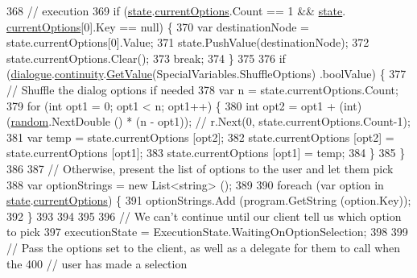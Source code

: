\begin{DoxyCode}
368                 \textcolor{comment}{// execution}
369                 \textcolor{keywordflow}{if} (\hyperlink{a00086_a70f2ce6201cdd2430ceaa764ac614ca0}{state}.\hyperlink{a00089_ab816dfea32ecda23282700f01454e0a9}{currentOptions}.Count == 1 && \hyperlink{a00086_a70f2ce6201cdd2430ceaa764ac614ca0}{state}.
      \hyperlink{a00089_ab816dfea32ecda23282700f01454e0a9}{currentOptions}[0].Key == null) \{
370                     var destinationNode = state.currentOptions[0].Value;
371                     state.PushValue(destinationNode);
372                     state.currentOptions.Clear();
373                     \textcolor{keywordflow}{break};
374                 \}
375 
376                 \textcolor{keywordflow}{if} (\hyperlink{a00086_ac506426c503da5f033247c29e11c5e82}{dialogue}.\hyperlink{a00050_ae94eaa4b03b432422f5d205fabe37ff5}{continuity}.\hyperlink{a00102_accab1fc5c8fc353dbfc53ca0f4029576}{GetValue}(SpecialVariables.ShuffleOptions)
      .boolValue) \{
377                     \textcolor{comment}{// Shuffle the dialog options if needed}
378                     var n = state.currentOptions.Count;
379                     \textcolor{keywordflow}{for} (\textcolor{keywordtype}{int} opt1 = 0; opt1 < n; opt1++) \{
380                         \textcolor{keywordtype}{int} opt2 = opt1 + (int)(\hyperlink{a00086_a408485a00c7cc558428c86ed9dd04fca}{random}.NextDouble () * (n - opt1)); \textcolor{comment}{// r.Next(0,
       state.currentOptions.Count-1);}
381                         var temp = state.currentOptions [opt2];
382                         state.currentOptions [opt2] = state.currentOptions [opt1];
383                         state.currentOptions [opt1] = temp;
384                     \}
385                 \}
386 
387                 \textcolor{comment}{// Otherwise, present the list of options to the user and let them pick}
388                 var optionStrings = \textcolor{keyword}{new} List<string> ();
389 
390                 \textcolor{keywordflow}{foreach} (var option \textcolor{keywordflow}{in} \hyperlink{a00086_a70f2ce6201cdd2430ceaa764ac614ca0}{state}.\hyperlink{a00089_ab816dfea32ecda23282700f01454e0a9}{currentOptions}) \{
391                     optionStrings.Add (program.GetString (option.Key));
392                 \}
393 
394 
395 
396                 \textcolor{comment}{// We can't continue until our client tell us which option to pick}
397                 executionState = ExecutionState.WaitingOnOptionSelection;
398 
399                 \textcolor{comment}{// Pass the options set to the client, as well as a delegate for them to call when the}
400                 \textcolor{comment}{// user has made a selection}

\end{DoxyCode}
